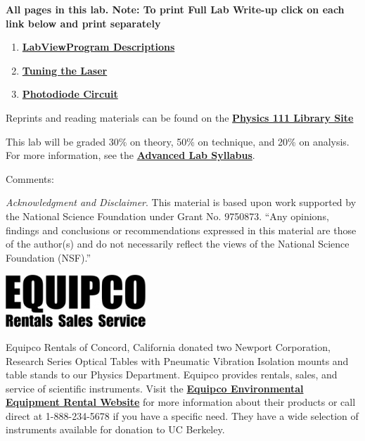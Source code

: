 \documentclass{../lab}
\begin{document}
\noindent\textbf{All pages in this lab. Note: To print Full Lab Write-up click on each link below and print separately }

\begin{enumerate}
    \item \href{http://experimentationlab.berkeley.edu/node/119}{\textbf{}}\href{http://experimentationlab.berkeley.edu/node/119}{\textbf{LabView}}\href{http://experimentationlab.berkeley.edu/node/119}{\textbf{Program Descriptions}}

    \item \href{http://experimentationlab.berkeley.edu/node/121#overlay-context=}{\textbf{Tuning the Laser}}
    
    \item \href{http://experimentationlab.berkeley.edu/node/120}{\textbf{Photodiode Circuit}}
\end{enumerate}

Reprints and reading materials can be found on the \href{http://physics111.lib.berkeley.edu/Physics111/Reprints/MNO/MNO\_index.html}{\textbf{Physics 111 Library Site}}

This lab will be graded 30\% on theory, 50\% on technique, and 20\% on analysis. For more information, see the \href{http://experimentationlab.berkeley.edu/syllabus}{\textbf{Advanced Lab Syllabus}}.

Comments: \Feedback

\emph{Acknowledgment and Disclaimer}. This material is based upon work supported by the National Science Foundation under Grant No. 9750873. ``Any opinions, findings and conclusions or recommendations expressed in this material are those of the author(s) and do not necessarily reflect the views of the National Science Foundation (NSF).''

\begin{center}
    \href{http://experimentationlab.berkeley.edu/sites/default/files/images/199px-Equipco_logo.png}{\includegraphics[width=0.5\linewidth]{images/199px-Equipco_logo.png}}
\end{center}

Equipco Rentals of Concord, California donated two Newport Corporation, Research Series Optical Tables with Pneumatic Vibration Isolation mounts and table stands to our Physics Department. Equipco provides rentals, sales, and service of scientific instruments. Visit the \href{http://www.equipcoservices.com/}{\textbf{Equipco Environmental Equipment Rental Website}} for more information about their products or call direct at 1-888-234-5678 if you have a specific need. They have a wide selection of instruments available for donation to UC Berkeley.
\end{document}
